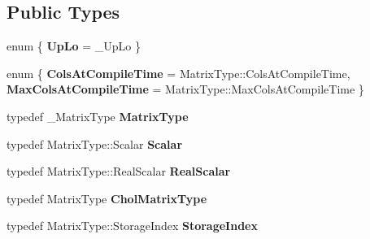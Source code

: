 \subsection*{Public Types}
\begin{DoxyCompactItemize}
\item 
\mbox{\label{class_eigen_1_1_cholmod_base_ade1824bda34b15c479030eec5e064ba8}} 
enum \{ {\bfseries Up\+Lo} = \+\_\+\+Up\+Lo
 \}
\item 
\mbox{\label{class_eigen_1_1_cholmod_base_a6b26a76af1d42d80ffec5d0a95f95f70}} 
enum \{ {\bfseries Cols\+At\+Compile\+Time} = Matrix\+Type\+::Cols\+At\+Compile\+Time, 
{\bfseries Max\+Cols\+At\+Compile\+Time} = Matrix\+Type\+::Max\+Cols\+At\+Compile\+Time
 \}
\item 
\mbox{\label{class_eigen_1_1_cholmod_base_afe78a31a015c2044984b8db916694af3}} 
typedef \+\_\+\+Matrix\+Type {\bfseries Matrix\+Type}
\item 
\mbox{\label{class_eigen_1_1_cholmod_base_ad6a5c19a8dda800ca460fc8dfc0fca08}} 
typedef Matrix\+Type\+::\+Scalar {\bfseries Scalar}
\item 
\mbox{\label{class_eigen_1_1_cholmod_base_a71ebe5db761957c82e451118f7ff7d63}} 
typedef Matrix\+Type\+::\+Real\+Scalar {\bfseries Real\+Scalar}
\item 
\mbox{\label{class_eigen_1_1_cholmod_base_a82a0f525caf126ef100aa602bb2b90ef}} 
typedef Matrix\+Type {\bfseries Chol\+Matrix\+Type}
\item 
\mbox{\label{class_eigen_1_1_cholmod_base_acbe43800768330fbf1b0dc38644031ff}} 
typedef Matrix\+Type\+::\+Storage\+Index {\bfseries Storage\+Index}
\end{DoxyCompactItemize}
